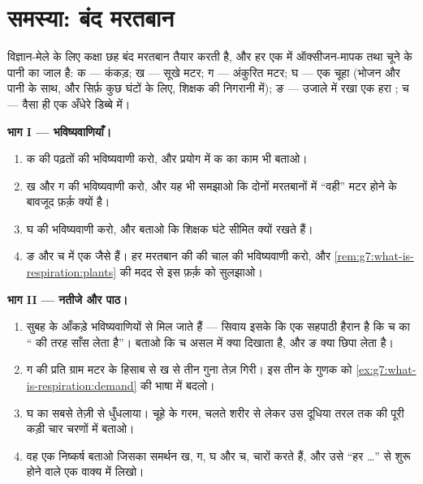 \section{समस्या: बंद मरतबान}

\begin{problem}\label{pb:g7:what-is-respiration:1}
विज्ञान-मेले के लिए कक्षा छह बंद मरतबान तैयार करती है, और हर एक में
ऑक्सीजन-मापक तथा चूने के पानी का जाल है: क --- कंकड़; ख --- सूखे मटर;
ग --- अंकुरित मटर; घ --- एक चूहा (भोजन और पानी के साथ, और सिर्फ़ कुछ
घंटों के लिए, शिक्षक की निगरानी में); ङ --- उजाले में रखा एक हरा ;
च --- वैसा ही  एक अँधेरे डिब्बे में।

\medskip\noindent\textbf{भाग I --- भविष्यवाणियाँ।}
\begin{enumerate}
  \item क की पढ़तों की भविष्यवाणी करो, और प्रयोग में क का काम भी
        बताओ।
  \item ख और ग की भविष्यवाणी करो, और यह भी समझाओ कि दोनों मरतबानों में
        ``वही'' मटर होने के बावजूद फ़र्क़ क्यों है।
  \item घ की भविष्यवाणी करो, और बताओ कि शिक्षक घंटे सीमित क्यों रखते
        हैं।
  \item ङ और च में एक जैसे  हैं। हर मरतबान की  की चाल की
        भविष्यवाणी करो, और
        \cref{rem:g7:what-is-respiration:plants} की मदद से इस फ़र्क़ को
        सुलझाओ।
\end{enumerate}

\medskip\noindent\textbf{भाग II --- नतीजे और पाठ।}
\begin{enumerate}[resume]
  \item सुबह के आँकड़े भविष्यवाणियों से मिल जाते हैं --- सिवाय इसके कि
        एक सहपाठी हैरान है कि च का  `` की तरह साँस लेता है''।
        बताओ कि च असल में क्या दिखाता है, और ङ क्या छिपा लेता है।
  \item ग की  प्रति ग्राम मटर के हिसाब से ख से तीन गुना तेज़
        गिरी। इस तीन के गुणक को
        \cref{ex:g7:what-is-respiration:demand} की भाषा में बदलो।
  \item घ का  सबसे तेज़ी से धुँधलाया। चूहे के गरम, चलते
        शरीर से लेकर उस दूधिया तरल तक की पूरी कड़ी चार चरणों में
        बताओ।
  \item वह एक निष्कर्ष बताओ जिसका समर्थन ख, ग, घ और च, चारों करते हैं,
        और उसे ``हर \dots'' से शुरू होने वाले एक वाक्य में लिखो।
\end{enumerate}


\end{problem}
